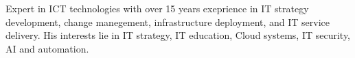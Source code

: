 

\begin{cvparagraph}

Expert in ICT technologies with over 15 years exeprience in IT strategy development, change manegement, infrastructure deployment, and IT service delivery. His interests lie in IT strategy, IT education, Cloud systems, IT security, AI and automation. 
\end{cvparagraph}
